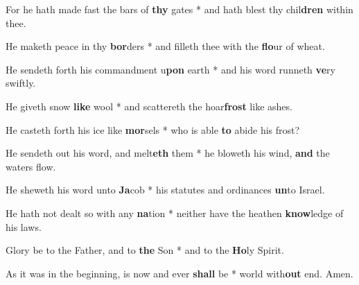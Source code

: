 \begin{multicols}{2}
	For he hath made fast the bars of \textbf{thy} gates * and hath blest thy chil\textbf{dren} within thee.
	
	He maketh peace in thy \textbf{bor}ders * and filleth thee with the \textbf{flo}ur of wheat.
	
	He sendeth forth his commandment u\textbf{pon} earth * and his word runneth \textbf{ve}ry swiftly.
	
	He giveth snow \textbf{like} wool * and scattereth the hoar\textbf{frost} like ashes.
	
	He casteth forth his ice like \textbf{mor}sels * who is able \textbf{to} abide his frost?
	
	He sendeth out his word, and melt\textbf{eth} them * he bloweth his wind, \textbf{and} the waters flow.
	
	He sheweth his word unto \textbf{Ja}cob * his statutes and ordinances \textbf{un}to Israel.
	
	He hath not dealt so with any \textbf{na}tion * neither have the heathen \textbf{know}ledge of his laws.
	
	Glory be to the Father, and to \textbf{the} Son * and to the \textbf{Ho}ly Spirit.
	
	As it was in the beginning, is now and ever \textbf{shall} be * world with\textbf{out} end. Amen.
\end{multicols}